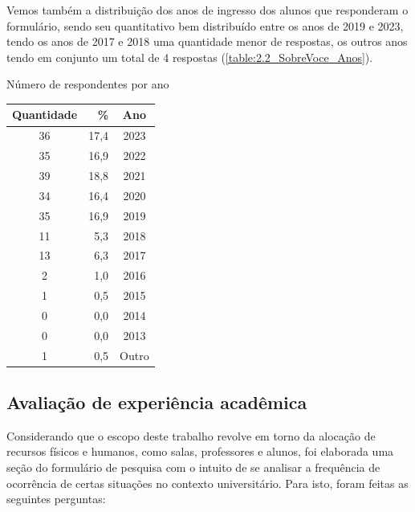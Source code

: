 \begin{apendicesenv}
  Vemos também a distribuição dos anos de ingresso dos alunos que responderam o formulário, sendo seu quantitativo bem distribuído entre os anos de 2019 e 2023, tendo os anos de 2017 e 2018 uma quantidade menor de respostas, os outros anos tendo em conjunto um total de 4 respostas (\autoref{table:2.2_SobreVoce_Anos}).

  \begin{CenteredTable} \caption{Número de respondentes por ano} \label{table:2.2_SobreVoce_Anos}
    \begin{tabular}{| c r c |}
      \hline
      \textbf{Quantidade} & \%   & \textbf{Ano} \\
      \hline
      36                  & 17,4 & 2023         \\
      35                  & 16,9 & 2022         \\
      39                  & 18,8 & 2021         \\
      34                  & 16,4 & 2020         \\
      35                  & 16,9 & 2019         \\
      11                  & 5,3  & 2018         \\
      13                  & 6,3  & 2017         \\
      2                   & 1,0  & 2016         \\
      1                   & 0,5  & 2015         \\
      0                   & 0,0  & 2014         \\
      0                   & 0,0  & 2013         \\
      1                   & 0,5  & Outro        \\
      \hline
    \end{tabular}
  \end{CenteredTable}

  \subsection{Avaliação de experiência acadêmica} %

  Considerando que o escopo deste trabalho revolve em torno da alocação de recursos físicos e humanos, como salas, professores e alunos, foi elaborada uma seção do formulário de pesquisa com o intuito de se analisar a frequência de ocorrência de certas situações no contexto universitário. Para isto, foram feitas as seguintes perguntas:


\end{apendicesenv}
